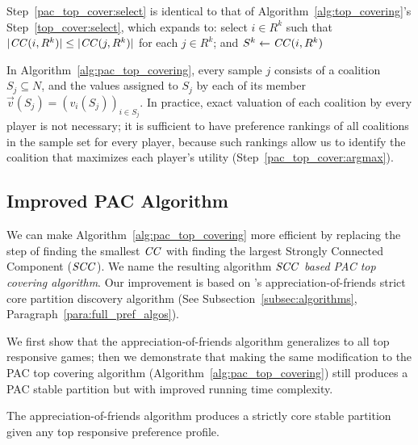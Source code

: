 Step~\ref{pac_top_cover:select} is identical to that of
Algorithm~\ref{alg:top_covering}'s Step~\ref{top_cover:select}, which expands to:
select $i\in R^k$ such that $|\mathit{CC}(i,R^k)| \leq |\mathit{CC}(j,R^k)|$ for each $j\in R^k$;
and $S^k\leftarrow \mathit{CC}(i,R^k)$

In Algorithm~\ref{alg:pac_top_covering}, every sample $j$ consists of a coalition
$S_j \subseteq N$, and the values assigned to $S_j$ by each of its member
$\vec{v}(S_j) = (v_i(S_j))_{i \in S_j}$.
In practice, exact valuation of each coalition by every player is not necessary;
it is sufficient to have preference rankings of all coalitions in the sample set
for every player, because such rankings allow us to identify the coalition that
maximizes each player's utility (Step~\ref{pac_top_cover:argmax}).


\subsection{Improved PAC Algorithm}
\label{subsec:improved_pac_algorithm}
We can make Algorithm~\ref{alg:pac_top_covering} more efficient
by replacing the step of finding the smallest $\mathit{CC}$ with finding the largest
Strongly Connected Component ($\mathit{SCC}$).
We name the resulting algorithm \textit{$\mathit{SCC}$ based PAC top covering algorithm}.
Our improvement is based on 's appreciation-of-friends
strict core partition discovery algorithm (See Subsection~\ref{subsec:algorithms},
Paragraph~\ref{para:full_pref_algos}).

We first show that the appreciation-of-friends algorithm generalizes to all top
responsive games; then we demonstrate that making the same modification to the
PAC top covering algorithm (Algorithm~\ref{alg:pac_top_covering}) still produces
a PAC stable partition but with improved running time complexity.

\begin{proposition}
\label{prop:scc_generalizes}
  The appreciation-of-friends algorithm produces a strictly core stable partition given any top responsive preference profile.
\end{proposition}

